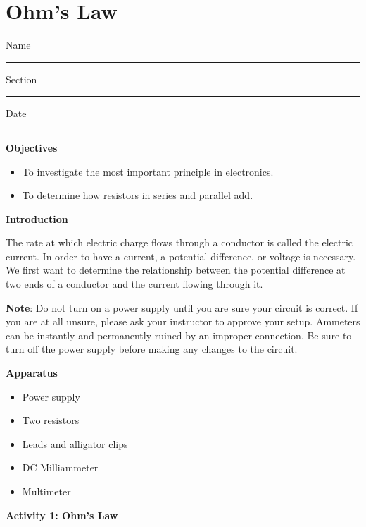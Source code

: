 
\section{Ohm's Law}

Name \rule{2.0in}{0.1pt}\hfill{}Section \rule{1.0in}{0.1pt}\hfill{}Date
\rule{1.0in}{0.1pt}

\textbf{Objectives}

\begin{itemize}
\item To investigate the most important principle in electronics.
\item To determine how resistors in series and parallel add.
\end{itemize}
\textbf{Introduction}

The rate at which electric charge flows through a conductor is called
the electric current. In order to have a current, a potential difference,
or voltage is necessary. We first want to determine the relationship
between the potential difference at two ends of a conductor and the
current flowing through it.

\textbf{Note}: Do not turn on a power supply until you are sure your
circuit is correct. If you are at all unsure, please ask your instructor
to approve your setup. Ammeters can be instantly and permanently ruined
by an improper connection. Be sure to turn off the power supply before
making any changes to the circuit.

\textbf{Apparatus}

\begin{itemize}
\item Power supply
\item Two resistors
\item Leads and alligator clips
\item DC Milliammeter
\item Multimeter
\end{itemize}
\textbf{Activity 1: Ohm's Law}

